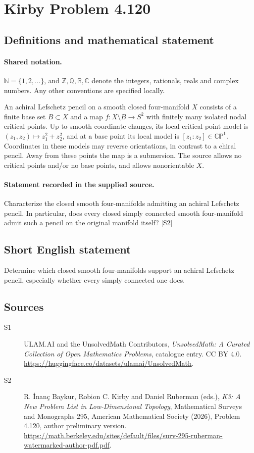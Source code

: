 \documentclass[11pt]{article}
\newcommand{\sref}[2]{\hyperlink{source:#1:#2}{[S#2]}}
\begin{document}
\section{Kirby Problem 4.120}\label{statement}

\subsection{Definitions and mathematical statement}

\paragraph{Shared notation.}$\mathbb N=\{1,2,\ldots\}$, and $\mathbb Z,\mathbb Q,\mathbb R,\mathbb C$ denote the integers, rationals, reals and complex numbers. Any other conventions are specified locally.


An achiral Lefschetz pencil on a smooth closed four-manifold $X$ consists of a finite base set $B\subset X$ and a map $f:X\setminus B\to S^2$ with finitely many isolated nodal critical points. Up to smooth coordinate changes, its local critical-point model is $(z_1,z_2)\mapsto z_1^2+z_2^2$, and at a base point its local model is $[z_1:z_2]\in\mathbb{CP}^1$. Coordinates in these models may reverse orientations, in contrast to a chiral pencil. Away from these points the map is a submersion. The source allows no critical points and/or no base points, and allows nonorientable $X$.
\paragraph{Statement recorded in the supplied source.}
Characterize the closed smooth four-manifolds admitting an achiral Lefschetz pencil. In particular, does every closed simply connected smooth four-manifold admit such a pencil on the original manifold itself? \sref{statement}{2}
\subsection{Short English statement}
Determine which closed smooth four-manifolds support an achiral Lefschetz pencil, especially whether every simply connected one does.
\subsection{Sources}
\begin{description}
\item[\hypertarget{source:statement:1}{S1}] ULAM.AI and the UnsolvedMath Contributors, \emph{UnsolvedMath: A Curated Collection of Open Mathematics Problems}, catalogue entry. CC BY 4.0. \url{https://huggingface.co/datasets/ulamai/UnsolvedMath}.
\item[\hypertarget{source:statement:2}{S2}] R. İnanç Baykur, Robion C. Kirby and Daniel Ruberman (eds.), \emph{K3: A New Problem List in Low-Dimensional Topology}, Mathematical Surveys and Monographs 295, American Mathematical Society (2026), Problem 4.120, author preliminary version. \url{https://math.berkeley.edu/sites/default/files/surv-295-ruberman-watermarked-author-pdf.pdf}.
\end{description}
\label{end:statement}
\end{document}
